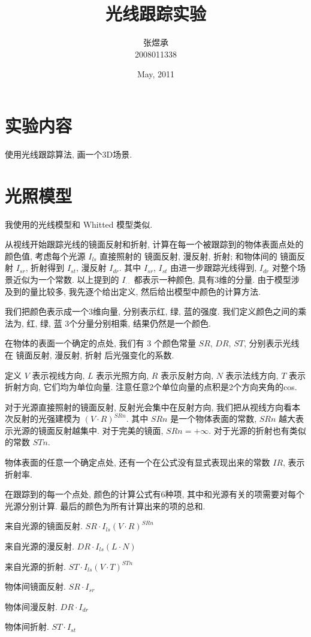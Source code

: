 \documentclass[11pt]{article}
\title{光线跟踪实验}
\author{张煜承 \\ 2008011338}
\date{May, 2011}
\begin{document}
\maketitle

\section{实验内容}
使用光线跟踪算法, 画一个3D场景.

\section{光照模型}
我使用的光线模型和 Whitted 模型类似.

从视线开始跟踪光线的镜面反射和折射,
计算在每一个被跟踪到的物体表面点处的颜色值,
考虑每个光源 $I_{ls}$ 直接照射的 镜面反射, 漫反射, 折射;
和物体间的 镜面反射 $I_{sr}$, 折射得到 $I_{st}$, 漫反射 $I_{dr}$.
其中 $I_{sr}$, $I_{st}$ 由进一步跟踪光线得到,
$I_{dr}$ 对整个场景近似为一个常数.
以上提到的 $I_{\cdot \cdot}$ 都表示一种颜色,
具有3维的分量.
由于模型涉及到的量比较多,
我先逐个给出定义,
然后给出模型中颜色的计算方法.

我们把颜色表示成一个3维向量,
分别表示红, 绿, 蓝的强度.
我们定义颜色之间的乘法为,
红, 绿, 蓝 3个分量分别相乘,
结果仍然是一个颜色.

在物体的表面一个确定的点处,
我们有 3 个颜色常量 $SR$, $DR$, $ST$,
分别表示光线在 镜面反射, 漫反射, 折射 后光强变化的系数.

定义 $V$ 表示视线方向,
$L$ 表示光照方向,
$R$ 表示反射方向,
$N$ 表示法线方向,
$T$ 表示折射方向,
它们均为单位向量.
注意任意2个单位向量的点积是2个方向夹角的cos.

对于光源直接照射的镜面反射,
反射光会集中在反射方向,
我们把从视线方向看本次反射的光强建模为 $(V \cdot R)^{SRn}$.
其中 $SRn$ 是一个物体表面的常数,
$SRn$ 越大表示光源的镜面反射越集中.
对于完美的镜面, $SRn = +\infty$.
对于光源的折射也有类似的常数 $STn$.

物体表面的任意一个确定点处,
还有一个在公式没有显式表现出来的常数 $IR$, 表示折射率.

在跟踪到的每一个点处,
颜色的计算公式有6种项,
其中和光源有关的项需要对每个光源分别计算.
最后的颜色为所有计算出来的项的总和.
\begin{compactitem}
\item 来自光源的镜面反射. $SR \cdot I_{ls} (V \cdot R)^{SRn}$
\item 来自光源的漫反射. $DR \cdot I_{ls} (L \cdot N)$
\item 来自光源的折射. $ST \cdot I_{ls} (V \cdot T)^{STn}$

\item 物体间镜面反射. $SR \cdot I_{sr}$
\item 物体间漫反射. $DR \cdot I_{dr}$
\item 物体间折射. $ST \cdot I_{st}$
\end{compactitem}
\end{document}
